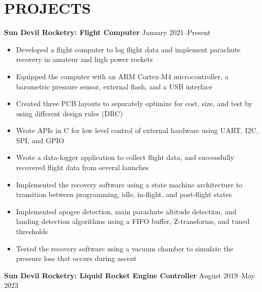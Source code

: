 \documentclass{article}
\begin{document}
\section{PROJECTS}
\textbf{Sun Devil Rocketry: Flight Computer}
\hfill
\vspace{0.5em}
January 2021--Present
\begin{itemize}
\item{Developed a flight computer to log flight data and implement parachute recovery in amateur and high power rockets}
\item{Equipped the computer with an ARM Cortex-M4 microcontroller, a barometric pressure sensor, external flash, and a USB interface}
\item{Created three PCB layouts to separately optimize for cost, size, and test by using different design rules (DRC) }
\item{Wrote APIs in C for low level control of external hardware using UART, I2C, SPI, and GPIO}
\item{Wrote a data-logger application to collect flight data, and successfully recovered flight data from several launches}
\item{Implemented the recovery software using a state machine architecture to transition between programming, idle, in-flight, and post-flight states}
\item{Implemented apogee detection, main parachute altitude detection, and landing detection algorithms using a FIFO buffer, Z-transforms, and tuned thresholds}
\item{Tested the recovery software using a vacuum chamber to simulate the pressure loss that occurs during ascent}
\end{itemize}
\vspace{1em}
\textbf{Sun Devil Rocketry: Liquid Rocket Engine Controller}
\hfill
\vspace{0.5em}
August 2019--May 2023
\end{document}
